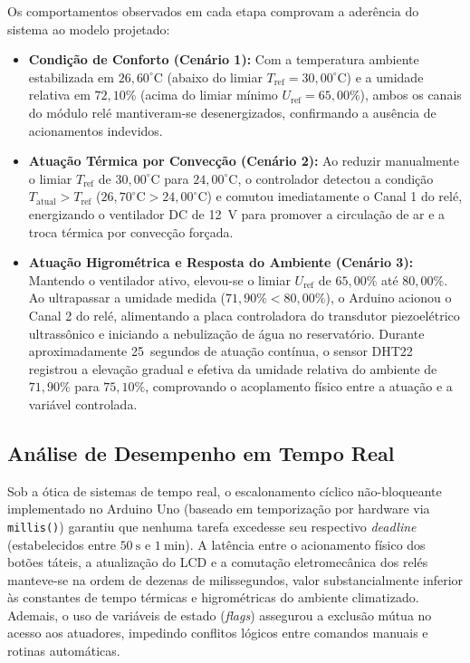 \documentclass[conference]{IEEEtran}
\begin{document}
Os comportamentos observados em cada etapa comprovam a aderência do sistema ao modelo projetado:

\begin{itemize}
    \item \textbf{Condição de Conforto (Cenário 1):} Com a temperatura ambiente estabilizada em $26{,}60^\circ\text{C}$ (abaixo do limiar $T_{\text{ref}} = 30{,}00^\circ\text{C}$) e a umidade relativa em $72{,}10\%$ (acima do limiar mínimo $U_{\text{ref}} = 65{,}00\%$), ambos os canais do módulo relé mantiveram-se desenergizados, confirmando a ausência de acionamentos indevidos.
    
    \item \textbf{Atuação Térmica por Convecção (Cenário 2):} Ao reduzir manualmente o limiar $T_{\text{ref}}$ de $30{,}00^\circ\text{C}$ para $24{,}00^\circ\text{C}$, o controlador detectou a condição $T_{\text{atual}} > T_{\text{ref}}$ ($26{,}70^\circ\text{C} > 24{,}00^\circ\text{C}$) e comutou imediatamente o Canal 1 do relé, energizando o ventilador DC de 12~V para promover a circulação de ar e a troca térmica por convecção forçada.
    
    \item \textbf{Atuação Higrométrica e Resposta do Ambiente (Cenário 3):} Mantendo o ventilador ativo, elevou-se o limiar $U_{\text{ref}}$ de $65{,}00\%$ até $80{,}00\%$. Ao ultrapassar a umidade medida ($71{,}90\% < 80{,}00\%$), o Arduino acionou o Canal 2 do relé, alimentando a placa controladora do transdutor piezoelétrico ultrassônico e iniciando a nebulização de água no reservatório. Durante aproximadamente 25~segundos de atuação contínua, o sensor DHT22 registrou a elevação gradual e efetiva da umidade relativa do ambiente de $71{,}90\%$ para $75{,}10\%$, comprovando o acoplamento físico entre a atuação e a variável controlada.
\end{itemize}

\subsection{Análise de Desempenho em Tempo Real}

Sob a ótica de sistemas de tempo real, o escalonamento cíclico não-bloqueante implementado no Arduino Uno (baseado em temporização por hardware via \texttt{millis()}) garantiu que nenhuma tarefa excedesse seu respectivo \textit{deadline} (estabelecidos entre $50~\text{s}$ e $1~\text{min}$). A latência entre o acionamento físico dos botões táteis, a atualização do LCD e a comutação eletromecânica dos relés manteve-se na ordem de dezenas de milissegundos, valor substancialmente inferior às constantes de tempo térmicas e higrométricas do ambiente climatizado. Ademais, o uso de variáveis de estado (\textit{flags}) assegurou a exclusão mútua no acesso aos atuadores, impedindo conflitos lógicos entre comandos manuais e rotinas automáticas.
\end{document}
